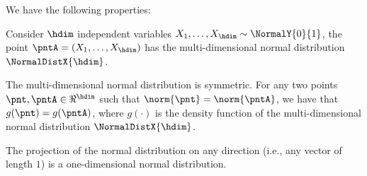 \begin{lemma}    
    We have the following properties:
    \begin{compactenumA}

        \smallskip%
        \item Consider $\hdim$ independent variables
        $X_1, \ldots, X_\hdim \sim \NormalY{0}{1}$, the point
        $\pntA = (X_1, \ldots, X_\hdim)$ has the multi-dimensional
        normal distribution $\NormalDistX{\hdim}$.

        \smallskip%
        \item The multi-dimensional normal distribution is
        symmetric. For any two points $\pnt, \pntA \in \Re^\hdim$ such
        that $\norm{ \pnt} = \norm{\pntA}$, we have that
        $g(\pnt) = g(\pntA)$, where $g(\cdot)$ is the density function
        of the multi-dimensional normal distribution
        $\NormalDistX{\hdim}$.

        \smallskip%
        \item The projection of the normal distribution on any
        direction (i.e., any vector of length $1$) is a
        one-dimensional normal distribution.
    \end{compactenumA}
\end{lemma}
